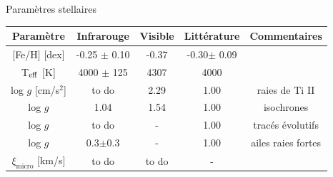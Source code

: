 \documentclass[10pt]{beamer}
\begin{document}
\begin{frame}[fragile]{Paramètres stellaires}
\begin{table}[h!]
    \begin{center}
        \renewcommand{\arraystretch}{1.5}
        \begin{tabular}{c|ccc|c}
            Paramètre & Infrarouge &Visible& Littérature &Commentaires\\
            \hline
            $[$Fe/H$]$ [dex]& -0.25 $\pm$ 0.10 & -0.37 &-0.30$\pm$ 0.09&\\
            T$_{\rm eff}$ [K] & 4000 $\pm$ 125 &4307 & 4000& \\

            log $g$ [cm/s$^2$]& to do & 2.29 & 1.00&raies de Ti II\\
            log $g$  & 1.04 & 1.54 & 1.00 &isochrones\\
            log $g$  & to do & - & 1.00 &tracés évolutifs\\
            log $g$  & 0.3$\pm$0.3 &-& 1.00 &ailes raies fortes\\
            $\xi_{\text{micro}}$ [km/s]& to do & to do & - &\\
        \end{tabular}
    \end{center}
\end{table}
\end{frame}
\end{document}
